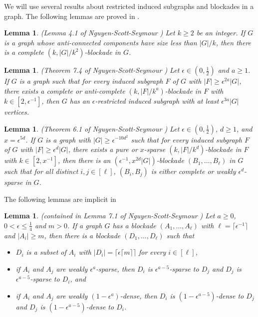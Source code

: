 \documentclass[a4paper,11pt]{article}
\newtheorem{lemma}[theorem]{Lemma}
\begin{document}
We will use several results about restricted induced subgraphs and blockades in a graph. 
The following lemmas are proved in \cite{NSS23}. 

\begin{lemma}\label{lem:complete-blockade-or-large-anticonnected-component}
\textnormal{(Lemma 4.1 of Nguyen-Scott-Seymour \cite{NSS23})} 
Let $k\geq 2$ be an integer. If $G$ is a graph whose anti-connected components have size less than $|G|/k$, then there is a complete $(k,|G|/k^2)$-blockade in $G$.
\end{lemma}


\begin{lemma}\label{lem:give a poly-rodl subgraph}
\textnormal{(Theorem 7.4 of Nguyen-Scott-Seymour \cite{NSS23})}
    Let $\epsilon\in(0,\frac{1}{2})$ and $a\geq 1$. If $G$ is a graph such that for every induced subgraph $F$ of $G$ with $|F|\geq \epsilon^{2a}|G|$, there exists a complete or anti-complete $(k,|F|/k^a)$-blockade in $F$ with $k\in [2,\epsilon^{-1}]$, then
    $G$ has an $\epsilon$-restricted induced subgraph with at least $\epsilon^{3a}|G|$ vertices.
\end{lemma}

\begin{lemma}\label{lem:pure or sparse to pairwise complete or weakly sparse}
\textnormal{(Theorem 6.1 of Nguyen-Scott-Seymour \cite{NSS23})}
    Let $\epsilon\in(0,\frac{1}{2})$, $d\geq 1$, and $x=\epsilon^{5d}$. 
    If $G$ is a graph with $|G|\geq \epsilon^{-10d^2}$ such that
    for every induced subgraph $F$ of $G$ with $|F|\geq \epsilon^{d}|G|$, there exists a pure or $x$-sparse $(k,|F|/k^d)$-blockade in $F$ with $k\in [2,x^{-1}]$, then there is an $(\epsilon^{-1},x^{2d}|G|)$-blockade $(B_1,\ldots,B_{\ell})$ in $G$ such that for all distinct $i,j\in[\ell]$, $(B_i,B_j)$ is either complete or weakly $\epsilon^d$-sparse in $G$.
\end{lemma}




The following lemmas are implicit in \cite{NSS232,NSS25,NSS23}


\begin{lemma}\label{lem:weakly sparse to sparse}
\textnormal{(contained in Lemma 7.1 of Nguyen-Scott-Seymour \cite{NSS23})}
    Let $a\geq 0$, $0<\epsilon\leq \frac{1}{4}$ and $m>0$. If a graph $G$ has a blockade $(A_1,\ldots,A_{\ell})$ with $\ell=\lceil \epsilon^{-1}\rceil$ and $|A_i|\geq m$,  
    then there is a blockade $(D_1,\ldots,D_\ell)$ such that 
    \begin{itemize}
        \item $D_i$ is a subset of $A_i$ with $|D_i|=\lceil\epsilon \lceil m\rceil\rceil$ for every $i\in [\ell]$,  
        \item if $A_i$ and $A_j$ are weakly $\epsilon^{a}$-sparse, then $D_i$ is $\epsilon^{a-5}$-sparse to $D_j$ and $D_j$ is $\epsilon^{a-5}$-sparse to $D_i$, and
        \item if $A_i$ and $A_j$ are weakly $(1-\epsilon^{a})$-dense, then $D_i$ is $(1-\epsilon^{a-5})$-dense to $D_j$ and $D_j$ is $(1-\epsilon^{a-5})$-dense to $D_i$.
    \end{itemize}
\end{lemma}
\end{document}
